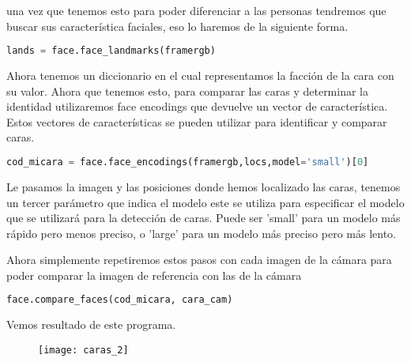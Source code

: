 una vez que tenemos esto para poder diferenciar a las personas tendremos que buscar sus
característica faciales, eso lo haremos de la siguiente forma. 

\begin{lstlisting}[language=Python]
  lands = face.face_landmarks(framergb)
\end{lstlisting}

Ahora tenemos un diccionario en el cual representamos la facción de la cara con su valor.
Ahora que tenemos esto, para comparar las caras y determinar la identidad utilizaremos 
face encodings que devuelve un vector de característica.
Estos vectores de características se pueden utilizar para identificar y comparar caras.

\begin{lstlisting}[language=Python]
  cod_micara = face.face_encodings(framergb,locs,model='small')[0]
\end{lstlisting}

Le pasamos la imagen y las posiciones donde hemos localizado las caras, tenemos un tercer parámetro
que indica el modelo este se utiliza para especificar el modelo que se utilizará para la detección de caras.
Puede ser 'small' para un modelo más rápido pero menos preciso, o 'large' para un modelo más preciso pero más lento.

Ahora simplemente repetiremos estos pasos con cada imagen de la cámara para poder comparar la imagen de referencia
con las de la cámara

\begin{lstlisting}[language=Python]
  face.compare_faces(cod_micara, cara_cam)
\end{lstlisting}

Vemos resultado de este programa.\\
\begin{figure}[H]
  \centering
  \texttt{[image: caras\_2]}
  \caption{}\label{fig:ejemplo_característica}
\end{figure}


